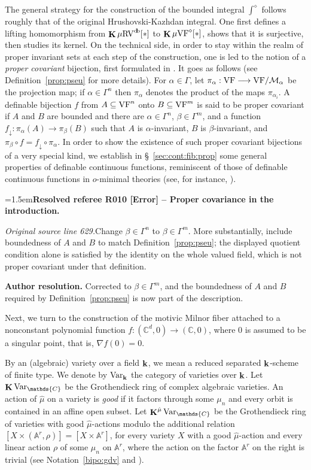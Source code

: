 \documentclass[12pt]{amsart}
\newcommand{\ResolvedRefereeRemark}[5]{%
  \par\medskip\begingroup\normalfont\small\color{gray}%
  \emergencystretch=1.5em\noindent\textbf{Resolved referee R#1 [#2] -- #3.}\par\nobreak\noindent #4\par
  \medskip\color{ResolutionGreen}\noindent\textbf{Author resolution.} #5\par
  \endgroup\medskip
}
\newcommand{\memph}[1]{{\color{magenta}\emph{#1}}}
\theoremstyle{plain}
\theoremstyle{definition}
\theoremstyle{remark}
\numberwithin{equation}{section}
\theoremstyle{plain}
\newcommand{\VF}{\textup{VF}}
\newcommand{\RV}{\textup{RV}}
\newcommand{\MM}{\mdl M}
\newcommand{\A}{\mathds{A}}
\newcommand{\C}{\mathds{C}}
\newcommand{\omin}{$o$\nobreakdash}
\newcommand{\0}{\emptyset}
\newcommand{\mdl}[1]{\mathcal{#1}}  %
\newcommand{\fun}{\longrightarrow}
\newcommand{\sub}{\subseteq}
\newcommand{\mgVF}{{\mu} {\VF}}
\newcommand{\mgRV}{{\mu}{\RV}}
\DeclareMathOperator{\ggk}{\mathbf{K}}
\DeclareMathOperator{\db}{d \! b}
\newcommand{\var}{\textup{Var}}
\DeclareMathOperator{\bfk}{\bf k}
\newcommand{\Var}{\textup{Var}}
\begin{document}
The general strategy for the construction of the bounded integral $\int^\diamond$ follows roughly that of the original Hrushovski-Kazhdan integral. One first defines a lifting homomorphism from $\ggk  \mgRV^{\db}[*]$ to $\ggk \mgVF^\diamond[*]$,  shows that it is surjective, then studies its kernel.
On the technical side, in order to stay within the realm of proper invariant sets at each step of the construction, one is led to the notion of a \memph{proper covariant} bijection, first formulated in \cite{hru:loe:lef}. It goes as follows (see Definition~\ref{prop:pseu} for more details). For $\alpha \in \Gamma$, let $\pi_\alpha : \VF\fun \VF/\MM_\alpha$ be the projection map;  if $\alpha\in \Gamma^n$ then $\pi_{\alpha}$ denotes the product of the maps $\pi_{\alpha_i}$. A definable bijection $f$ from $A\sub \VF^n$ onto  $B \sub \VF^m$ is said to be proper covariant if $A$ and $B$ are bounded and there are $\alpha \in \Gamma^n$, $\beta \in \Gamma^m$, and a function $f_\downarrow : \pi_{\alpha}(A) \fun \pi_{\beta}(B)$ such that $A$ is $\alpha$-invariant, $B$ is $\beta$-invariant, and  $\pi_\beta \circ f = f_\downarrow \circ \pi_\alpha$. In order to show the existence of such proper covariant bijections of a very special kind, we establish in \S~\ref{sec:cont:fib:prop} some general properties of definable continuous functions, reminiscent of those of definable continuous functions in \omin-minimal theories (see, for instance,  \cite[Chapter~6]{dries:1998}).

\ResolvedRefereeRemark{010}{Error}{Proper covariance in the introduction}{%
\textit{Original source line 629.}\quad Change $\beta\in\Gamma^n$ to $\beta\in\Gamma^m$. More substantially, include boundedness of $A$ and $B$ to match Definition~\ref{prop:pseu}; the displayed quotient condition alone is satisfied by the identity on the whole valued field, which is not proper covariant under that definition.
}{Corrected to $\beta\in\Gamma^m$, and the boundedness of $A$ and $B$ required by Definition~\ref{prop:pseu} is now part of the description.}

Next, we turn to the construction of the motivic Milnor fiber attached to a nonconstant polynomial function $f : (\C^d, 0) \fun (\C, 0)$,  where $0$ is assumed to be a singular point, that is, $\nabla f (0) = 0$.

By an (algebraic) variety over a field $\bfk$, we mean a reduced separated $\bfk$-scheme of finite type. We denote by $\Var_{\bfk}$ the category of  varieties over $\bfk$.
Let $\ggk \var_{\C}$ be the Grothendieck ring of complex algebraic varieties. An action of $\hat \mu$ on a variety is \memph{good} if it factors through some $\mu_n$ and every orbit is contained in an affine open subset. Let $\ggk^{\hat \mu} \var_{\C}$ be the Grothendieck ring of varieties with good $\hat \mu$-actions modulo the additional relation $[X \times (\A^r, \rho)] = [X \times \A^r]$, for every variety $X$ with a good $\hat \mu$-action and every linear action $\rho$ of some $\mu_n$ on $\A^r$, where the action on the factor $\A^r$ on the right is trivial (see Notation~\ref{bipo:gdv} and \cite[\S~2.4]{denefloeser:arc}).
\end{document}
